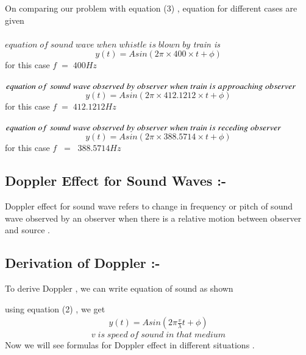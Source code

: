 \documentclass[journal,12pt,twocolumn]{IEEEtran}
\theoremstyle{remark}
\begin{document}
On comparing our problem with equation (3) , equation for different cases are given\\\\
$equation \;of\; sound\; wave\; when\; whistle\; is\; blown\; by$
\textit{train is}
$$y(t) = Asin( 2 \pi \times400\times t + \phi ) $$ 
\;\;\;\;\;\;\;\;\;\;\;\;\;\;\;\;\;\;\;\;for this case $f\;=\;400Hz$\\\\
$equation \;of\; sound\; wave\; observed\; by\; observer\;when\\ \;train\;is\; approaching\; observer\;$
$$y(t) = Asin( 2 \pi \times412.1212\times t + \phi ) $$ 
\;\;\;\;\;\;\;\;\;\;\;\;\;\;\;\;\;\;\;\;for this case $f\;=\;412.1212Hz$\\\\
$equation \;of\; sound\; wave\; observed\; by\; observer\;when\\ \;train\;is\; receding\; observer\;$
$$y(t) = Asin( 2 \pi \times388.5714\times t + \phi ) $$ 
\;\;\;\;\;\;\;\;\;\;\;\;\;\;\;\;\;\;\;\;for this case $f \;\;= \;\;388.5714Hz$
\subsection*{\textbf{Doppler Effect for Sound Waves :-}}
Doppler effect for sound wave refers to change in frequency or pitch of sound wave observed by an observer when there is a relative motion between observer and source .\\

\subsection*{\textbf{Derivation \;of \;Doppler :-}}
To derive Doppler , we can write equation of sound as shown

using equation (2) , we get
\begin{align}y(t) = Asin( 2 \pi \frac{v}{\lambda}t + \phi ) \end{align}  
$$v \;is\; speed\; of\; sound\; in\; that\; medium$$
Now we will see formulas for Doppler effect in different situations . \\
\newpage
\bigskip
    \begin{table}[h!]
   
        
       
    \end{table}
 
\end{document}
